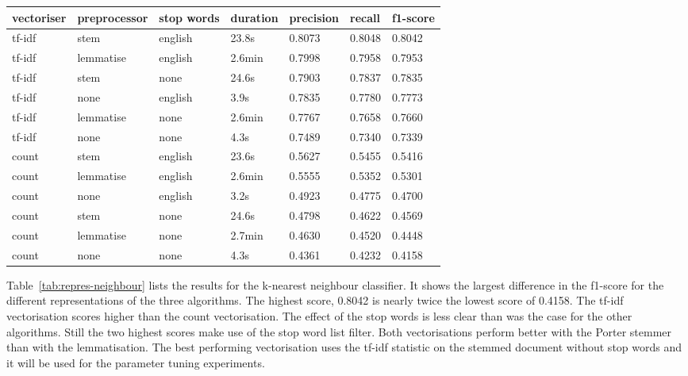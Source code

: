 \documentclass[11pt]{article}
\begin{document}
\begin{table*}[ht]\footnotesize
\centering
\begin{tabular}{ l l l l l l l }
vectoriser & preprocessor & stop words & duration & precision & recall & f1-score \\
\hline
tf-idf & stem & english & 23.8s & 0.8073 & 0.8048 & 0.8042 \\
tf-idf & lemmatise & english & 2.6min & 0.7998 & 0.7958 & 0.7953 \\
tf-idf & stem & none & 24.6s & 0.7903 & 0.7837 & 0.7835 \\
tf-idf & none & english & 3.9s & 0.7835 & 0.7780 & 0.7773  \\
tf-idf & lemmatise & none & 2.6min & 0.7767 & 0.7658 & 0.7660 \\
tf-idf & none & none & 4.3s & 0.7489 & 0.7340 & 0.7339 \\
count & stem & english & 23.6s & 0.5627 & 0.5455 & 0.5416 \\
count & lemmatise & english & 2.6min & 0.5555 & 0.5352 & 0.5301 \\
count & none & english & 3.2s & 0.4923 & 0.4775 & 0.4700 \\
count & stem & none &  24.6s & 0.4798 & 0.4622 & 0.4569 \\
count & lemmatise & none & 2.7min & 0.4630 & 0.4520 & 0.4448 \\
count & none & none & 4.3s & 0.4361 & 0.4232 & 0.4158 \\
\end{tabular}
\caption{scores for different representations and the k-nearest neighbour classifier sorted by f1-score}
\label{tab:repres-neighbour}
\end{table*}

Table~\ref{tab:repres-neighbour} lists the results for the k-nearest neighbour classifier. It shows the largest difference in the f1-score for the different representations of the three algorithms. The highest score, 0.8042 is nearly twice the lowest score of 0.4158. The tf-idf vectorisation scores higher than the count vectorisation. The effect of the stop words is less clear than was the case for the other algorithms. Still the two highest scores make use of the stop word list filter. Both vectorisations perform better with the Porter stemmer than with the lemmatisation. The best performing vectorisation uses the tf-idf statistic on the stemmed document without stop words and it will be used for the parameter tuning experiments.
\end{document}
